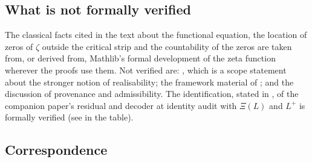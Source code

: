 \subsection*{What is not formally verified}

The classical facts cited in the text about the functional equation,
the location of zeros of \(\zeta\) outside the critical strip and the
countability of the zeros are taken from, or derived from, Mathlib's
formal development of the zeta function wherever the proofs use them.  Not verified are: , which is a scope
statement about the stronger notion of realisability; the framework
material of ; and the discussion of
provenance and admissibility.  The identification, stated in
, of the companion paper's residual and
decoder at identity audit with \(\Xi(L)\) and \(L^+\) is formally
verified (see  in the table).

\subsection*{Correspondence}

